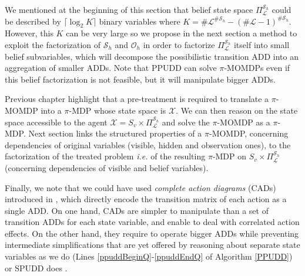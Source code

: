 We mentioned at the beginning of this section 
that belief state space $\Pi^{\mathcal{S}_h}_{\mathcal{L}}$
could be described by $\lceil \log_2 K \rceil$ binary variables where $K=\#
\mathcal{L}^{\#\mathcal{S}_h} - (\# \mathcal{L}-1)^{\# \mathcal{S}_h}$. 
However, this $K$ can be
very large so we propose 
in the next section a method to exploit the
factorization of $\mathcal{S}_h$ and $\mathcal{O}_h$ 
in order to factorize $\Pi^{\mathcal{S}_h}_{\mathcal{L}}$
itself into small belief subvariables, which will decompose the possibilistic
transition ADD into an aggregation of smaller ADDs.
Note that PPUDD can solve $\pi$-MOMDPs even if this belief factorization is not 
feasible, but it will manipulate bigger ADDs.

Previous chapter highlight that 
a pre-treatment is required to translate
a $\pi$-MOMDP into a $\pi$-MDP whose state space is $\mathcal{X}$.
We can then reason on the state space accessible to the agent 
$\mathcal{X} = S_v \times \Pi^{\mathcal{S}_h}_{\mathcal{L}}$ and
solve the $\pi$-MOMDP as a $\pi$-MDP.
Next section links the structured properties of a $\pi$-MOMDP,
concerning dependencies of original variables (visible, hidden and observation ones), 
to the factorization of the treated problem \textit{i.e.} of the resulting $\pi$-MDP 
on $S_v \times \Pi^{\mathcal{S}_h}_{\mathcal{L}}$ (concerning dependencies of visible and belief variables).

Finally, we note that we could have used \emph{complete action diagrams} (CADs)
introduced in \cite{St-aubin00apricodd:approximate}, 
which directly encode the
transition matrix of each action as a single ADD.
On one hand, CADs are simpler
to manipulate than a set of transition ADDs for each state variable, and enable
to deal with correlated action effects. On the other hand,
they require to
operate bigger ADDs while preventing intermediate simplifications that are yet
offered by reasoning about separate state variables as we do (Lines
\ref{ppuddBeginQ}-\ref{ppuddEndQ} of Algorithm \ref{PPUDD}) or SPUDD does
\cite{Hoey99spudd:stochastic}.

